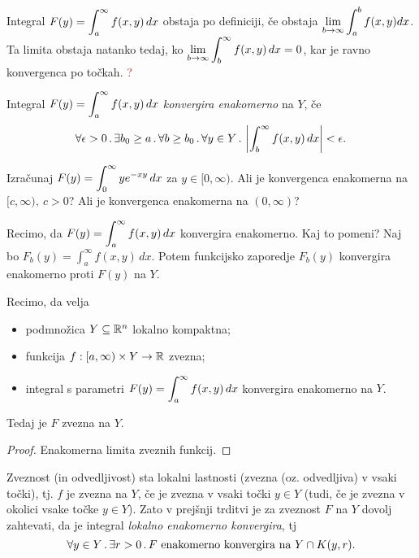 \begin{opomba}
    Integral \(\displaystyle F(y) = \int_{a}^{\infty} f(x,y) \, dx\) obstaja po definiciji, če obstaja $\displaystyle \lim_{b \to \infty} \int_{a}^{b} f(x,y) dx$. Ta limita obstaja natanko tedaj, ko $\displaystyle \lim_{b \to \infty} \int_{b}^{\infty} f(x,y) \, dx = 0$, kar je ravno konvergenca po točkah. \textcolor{red}{?}
\end{opomba}

\begin{definicija}
    Integral \(\displaystyle F(y) = \int_{a}^{\infty} f(x,y) \, dx\) \emph{konvergira enakomerno} na \(Y\), če 
    $$\forall \epsilon > 0 \,.\, \exists b_0 \geq a \,.\, \forall b \geq b_0 \,.\, \forall y \in Y \,.\, \left|\int_{b}^{\infty} f(x,y) \, dx \right| < \epsilon.$$
\end{definicija}

\begin{zgled}
    Izračunaj \(\displaystyle F(y) = \int_{0}^{\infty} y e^{-xy} \, dx\) za \(y \in [0, \infty)\). Ali je konvergenca enakomerna na \([c, \infty), \ c > 0\)? Ali je konvergenca enakomerna na $(0, \infty)$?
\end{zgled}

\begin{opomba}
    Recimo, da \(\displaystyle F(y) = \int_{a}^{\infty} f(x,y) \, dx\) konvergira enakomerno. Kaj to pomeni? Naj bo $F_b(y) = \int_{a}^{\infty} f(x,y) \, dx$. Potem funkcijsko zaporedje $F_b(y)$ konvergira enakomerno proti $F(y)$ na $Y$.
\end{opomba}

\begin{trditev}
    Recimo, da velja
    \begin{itemize}
        \item podmnožica \(Y \subseteq \mathbb{R}^n\) lokalno kompaktna;
        \item funkcija \(f :[a, \infty) \times Y \to \mathbb{R}\) zvezna;
        \item integral s parametri \(\displaystyle F(y) = \int_{a}^{\infty} f(x,y) \, dx\) konvergira enakomerno na \(Y\).
    \end{itemize}
    Tedaj je \(F\) zvezna na \(Y\).
\end{trditev}

\begin{proof}
    Enakomerna limita zveznih funkcij.
\end{proof}

\begin{opomba}
    Zveznost (in odvedljivost) sta lokalni lastnosti (zvezna (oz. odvedljiva) v vsaki točki), tj. $f$ je zvezna na $Y$, če je zvezna v vsaki točki \(y \in Y\) (tudi, če je zvezna v okolici vsake točke \(y \in Y\)). Zato v prejšnji trditvi je za zveznost \(F\) na \(Y\) dovolj zahtevati, da je integral \emph{lokalno enakomerno konvergira}, tj
    $$\forall y\in Y \,.\, \exists r>0 \,.\, F \text{ enakomerno konvergira na } Y \cap K(y,r).$$
\end{opomba}

